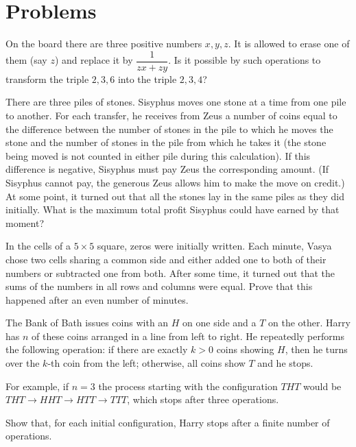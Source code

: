 \section{Problems}

\begin{problem} 
On the board there are three positive numbers $x,y,z$. It is allowed to erase one of them (say $z$) and replace it by $\dfrac{1}{zx+zy}$. Is it possible by such operations to transform the triple $2,3,6$ into the triple $2,3,4$? 
\end{problem}

\begin{problem}[Russia 1995]
    There are three piles of stones. Sisyphus moves one stone at a time from one pile to another. For each transfer, he receives from Zeus a number of coins equal to the difference between the number of stones in the pile to which he moves the stone and the number of stones in the pile from which he takes it (the stone being moved is not counted in either pile during this calculation). If this difference is negative, Sisyphus must pay Zeus the corresponding amount. (If Sisyphus cannot pay, the generous Zeus allows him to make the move on credit.) At some point, it turned out that all the stones lay in the same piles as they did initially. What is the maximum total profit Sisyphus could have earned by that moment?
\end{problem}

\begin{problem}[Russia 2008]
    In the cells of a $5 \times 5$ square, zeros were initially written. Each minute, Vasya chose two cells sharing a common side and either added one to both of their numbers or subtracted one from both. After some time, it turned out that the sums of the numbers in all rows and columns were equal. Prove that this happened after an even number of minutes.
\end{problem}

\begin{problem}[IMO 2019]
    The Bank of Bath issues coins with an $H$ on one side and a $T$ on the other. Harry has $n$ of these coins arranged in a line from left to right. He repeatedly performs the following operation: if there are exactly $k>0$ coins showing $H$, then he turns over the $k$-th coin from the left; otherwise, all coins show $T$ and he stops.

    For example, if $n=3$ the process starting with the configuration $THT$ would be $THT \to HHT \to HTT \to TTT$, which stops after three operations.

    Show that, for each initial configuration, Harry stops after a finite number of operations.
\end{problem}

